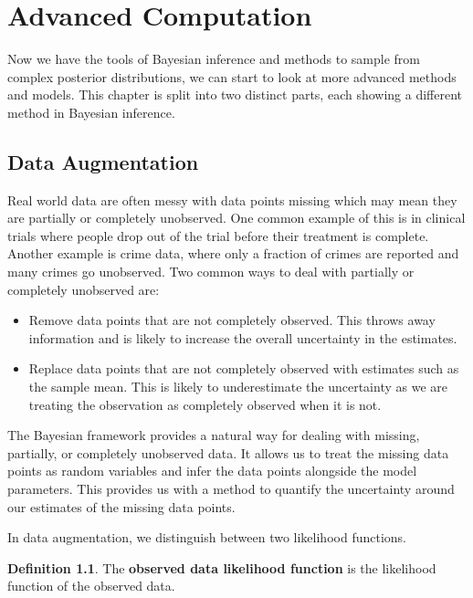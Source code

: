 \documentclass[
]{book}
\providecommand{\tightlist}{%
  \setlength{\itemsep}{0pt}\setlength{\parskip}{0pt}}
\theoremstyle{definition}
\newtheorem{definition}{Definition}[chapter]
\theoremstyle{definition}
\theoremstyle{definition}
\theoremstyle{definition}
\theoremstyle{remark}
\begin{document}
\hypertarget{advanced-computation}{%
\chapter{Advanced Computation}\label{advanced-computation}}

Now we have the tools of Bayesian inference and methods to sample from complex posterior distributions, we can start to look at more advanced methods and models. This chapter is split into two distinct parts, each showing a different method in Bayesian inference.

\hypertarget{data-augmentation}{%
\section{Data Augmentation}\label{data-augmentation}}

Real world data are often messy with data points missing which may mean they are partially or completely unobserved. One common example of this is in clinical trials where people drop out of the trial before their treatment is complete. Another example is crime data, where only a fraction of crimes are reported and many crimes go unobserved. Two common ways to deal with partially or completely unobserved are:

\begin{itemize}
\tightlist
\item
  Remove data points that are not completely observed. This throws away information and is likely to increase the overall uncertainty in the estimates.
\item
  Replace data points that are not completely observed with estimates such as the sample mean. This is likely to underestimate the uncertainty as we are treating the observation as completely observed when it is not.
\end{itemize}

The Bayesian framework provides a natural way for dealing with missing, partially, or completely unobserved data. It allows us to treat the missing data points as random variables and infer the data points alongside the model parameters. This provides us with a method to quantify the uncertainty around our estimates of the missing data points.

In data augmentation, we distinguish between two likelihood functions.

\begin{definition}
The \textbf{observed data likelihood function} is the likelihood function of the observed data.
\end{definition}
\end{document}
